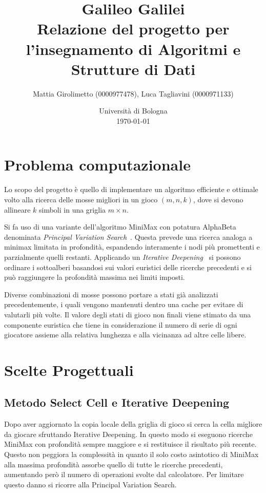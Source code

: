 \documentclass{article}
\title{Galileo Galilei \\
\large Relazione del progetto per l'insegnamento di Algoritmi e Strutture di Dati}
\author{
  Mattia Girolimetto (0000977478),
  Luca Tagliavini (0000971133)
}
\date{
	Universit\`a di Bologna \\
  \today
}
\begin{document}
\maketitle

\section{Problema computazionale}

Lo scopo del progetto \`e quello di implementare un algoritmo efficiente e ottimale
volto alla ricerca delle mosse migliori in un gioco $(m,n,k)$, dove si devono
allineare $k$ simboli in una griglia $m \times n$.

Si fa uso di una variante dell'algoritmo MiniMax con potatura
AlphaBeta denominata \emph{Principal Variation Search}~\cite{negascout}. Questa
prevede una ricerca analoga a minimax limitata in profondit\`a, espandendo 
interamente i nodi pi\`u promettenti e parzialmente quelli restanti. Applicando
un \emph{Iterative Deepening}~\cite{id} si possono ordinare i sottoalberi
basandosi sui valori euristici delle ricerche precedenti e si pu\`o raggiungere
la profondit\`a massima nei limiti imposti.

Diverse combinazioni di mosse possono portare a stati gi\`a analizzati
precedentemente, i quali vengono mantenuti dentro una cache per evitare di
valutarli pi\`u volte. Il valore degli stati di gioco non finali viene stimato %
da una componente euristica che tiene in considerazione il numero di serie di
ogni giocatore assieme alla relativa lunghezza e alla vicinanza ad altre celle
libere.

\section{Scelte Progettuali}

\subsection{Metodo Select Cell e Iterative Deepening}
Dopo aver aggiornato la copia locale della griglia di gioco si cerca la cella %
migliore da giocare sfruttando Iterative Deepening. 
In questo modo si eseguono ricerche MiniMax con profondit\`a sempre maggiore
e si restituisce il risultato pi\`u recente. Questo non
peggiora la complessit\`a in quanto il solo costo asintotico di MiniMax alla
massima profondit\`a assorbe quello di tutte le ricerche precedenti, aumentando 
per\`o il numero di operazioni svolte dal calcolatore. 
Per limitare questo danno si ricorre alla Principal Variation Search.
\end{document}
